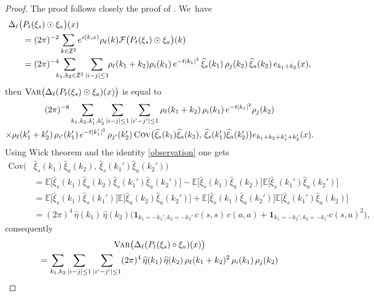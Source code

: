 \documentclass[10pt]{amsart}
\theoremstyle{definition}
\newcommand\bbE{\mathbb{E}}
\newcommand{\bsfZ}{\mathbf{\mathsf{Z}}}
\newcommand{\bfone}{\mathbf{1}}
\begin{document}
\begin{proof}
The proof follows closely the proof of \cite[Lem.\,5.2]{GIP}. We~have
\begin{align*}
\Delta_\ell\bigl(&P_t(\xi_s)\odot \xi_a\bigr)(x) \\
&= (2\pi)^{-2}\sum_{k\in\bsfZ^2}e^{i(k,x)}\rho_\ell(k) \mathcal{F}\bigl(P_t(\xi_s)\odot\xi_a\bigr)(k) \\
&=(2\pi)^{-4} \hspace{-0.2cm} \sum_{k_1,k_2\in\bsfZ^2}\sum_{|i-j|\leq 1} \hspace{-0.1cm} \rho_\ell(k_1+k_2)\rho_i(k_1) \, e^{-t|k_1|^2} \, \widehat\xi_s(k_1) \, \rho_j(k_2) \, \widehat\xi_a(k_2) \, e_{k_1+k_2}(x),
\end{align*}
then $\textsc{{Var}}\bigl(\Delta_\ell(P_t(\xi_s)\odot\xi_a)(x)\bigr)$ is equal to
\begin{multline*}
(2\pi)^{-8}\sum_{k_1,k_2,k_1',k_2'}\sum_{|i-j|\leq 1}\sum_{|i'-j'|\leq 1}\rho_\ell(k_1+k_2) \, \rho_i(k_1) \, e^{-t|k_1|^2}\rho_j(k_2)
\\
\times\rho_\ell(k_1'+k_2') \, \rho_{i'}(k_1') \, e^{-t|k_1'|^2} \, \rho_{j'}(k_2') \, \textsc{Cov}\bigl(\widehat\xi_s(k_1)\widehat\xi_a(k_2),\, \widehat\xi_s(k_1')\widehat\xi_a(k_2')\bigr)e_{k_1+k_2+k_1'+k_2'}(x).
\end{multline*}
Using Wick theorem and the identity \ref{observation} one gets
\begin{align*}
\text{Cov}\bigl(&\widehat\xi_s(k_1) \widehat\xi_a(k_2),\, \widehat\xi_s(k_1')\widehat\xi_a(k_2')\bigr) \\
&= \bbE\bigl[\widehat\xi_s(k_1)\widehat\xi_a(k_2)\widehat\xi_s(k_1')\widehat\xi_a(k_2')\bigr]-\bbE\bigl[\widehat\xi_s(k_1)\widehat\xi_a(k_2)\bigr]\bbE\bigl[\widehat\xi_s(k_1')\widehat\xi_a(k_2')\bigr] \\ &= \bbE\bigl[\widehat\xi_s(k_1)\widehat\xi_s(k_1')\bigr]\bbE\bigl[\widehat\xi_a(k_2)\widehat\xi_a(k_2')\bigr] + \bbE\bigl[\widehat\xi_s(k_1)\widehat\xi_a(k_2')\bigr]\bbE\bigl[\widehat\xi_s(k_1')\widehat\xi_a(k_2)\bigr] \\
&= (2\pi)^4 \, \widehat\eta(k_1) \, \widehat\eta(k_2)\bigl( \bfone_{k_1=-k_1', k_2=-k_2'}\,c(s,s) \, c(a,a) + \bfone_{k_1=-k_2', k_2=-k_1'}c(s,a)^2\bigr),
\end{align*}
consequently
\begin{multline*}
\textsc{{Var}}\bigl(\Delta_\ell(P_t(\xi_s)\circ\xi_a)(x)\bigr) \\
= \sum_{k_1,k_2} \sum_{|i-j|\leq 1}\sum_{|i'-j'|\leq 1} (2\pi)^4 \, \widehat\eta(k_1) \, \widehat\eta(k_2) \, \rho_\ell(k_1+k_2)^2 \, \rho_i(k_1) \, \rho_j(k_2)

\end{multline*}
\end{proof}
\end{document}
